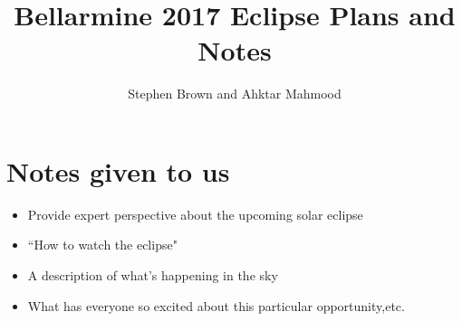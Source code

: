 \documentclass{article}
\title{Bellarmine 2017 Eclipse Plans and Notes}
\author{Stephen Brown and Ahktar Mahmood}
\begin{document}
\maketitle


\section{Notes given to us}

\begin{itemize}
\item Provide expert perspective about the upcoming solar eclipse
\item ``How to watch the eclipse"
\item A description of what's happening in the sky
\item What has everyone so excited about this particular opportunity,etc.
\end{itemize}
\end{document}

